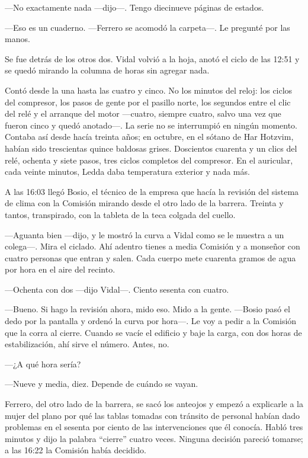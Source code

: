 ---No exactamente nada ---dijo---. Tengo diecinueve páginas de estados.

---Eso es un cuaderno. ---Ferrero se acomodó la carpeta---. Le pregunté por las manos.

Se fue detrás de los otros dos. Vidal volvió a la hoja, anotó el ciclo de las 12:51 y se quedó mirando la columna de horas sin agregar nada.

Contó desde la una hasta las cuatro y cinco. No los minutos del reloj: los ciclos del compresor, los pasos de gente por el pasillo norte, los segundos entre el clic del relé y el arranque del motor ---cuatro, siempre cuatro, salvo una vez que fueron cinco y quedó anotado---. La serie no se interrumpió en ningún momento. Contaba así desde hacía treinta años; en octubre, en el sótano de Har Hotzvim, habían sido trescientas quince baldosas grises. Doscientos cuarenta y un clics del relé, ochenta y siete pasos, tres ciclos completos del compresor. En el auricular, cada veinte minutos, Ledda daba temperatura exterior y nada más.

A las 16:03 llegó Bosio, el técnico de la empresa que hacía la revisión del sistema de clima con la Comisión mirando desde el otro lado de la barrera. Treinta y tantos, transpirado, con la tableta de la teca colgada del cuello.

---Aguanta bien ---dijo, y le mostró la curva a Vidal como se le muestra a un colega---. Mira el ciclado. Ahí adentro tienes a media Comisión y a monseñor con cuatro personas que entran y salen. Cada cuerpo mete cuarenta gramos de agua por hora en el aire del recinto.

---Ochenta con dos ---dijo Vidal---. Ciento sesenta con cuatro.

---Bueno. Si hago la revisión ahora, mido eso. Mido a la gente. ---Bosio pasó el dedo por la pantalla y ordenó la curva por hora---. Le voy a pedir a la Comisión que la corra al cierre. Cuando se vacíe el edificio y baje la carga, con dos horas de estabilización, ahí sirve el número. Antes, no.

---¿A qué hora sería?

---Nueve y media, diez. Depende de cuándo se vayan.

Ferrero, del otro lado de la barrera, se sacó los anteojos y empezó a explicarle a la mujer del plano por qué las tablas tomadas con tránsito de personal habían dado problemas en el sesenta por ciento de las intervenciones que él conocía. Habló tres minutos y dijo la palabra ``cierre'' cuatro veces. Ninguna decisión pareció tomarse; a las 16:22 la Comisión había decidido.

